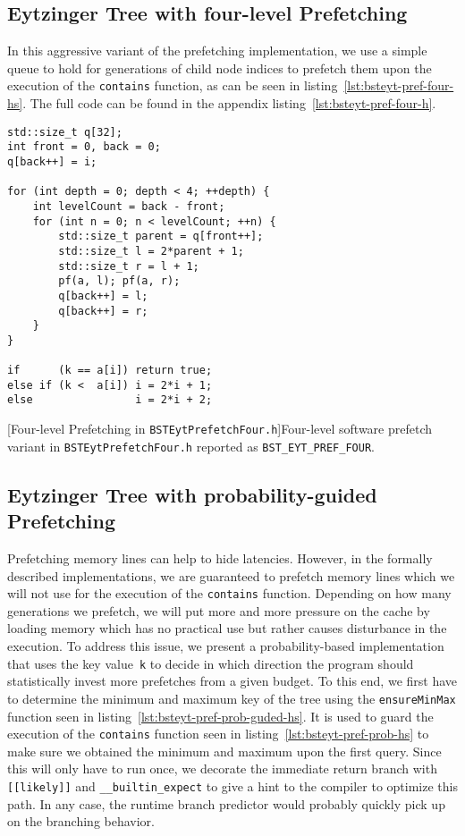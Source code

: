 \documentclass{article}
\begin{document}
\subsection{Eytzinger Tree with four-level Prefetching}
In this aggressive variant of the prefetching implementation, we use a simple queue to hold for generations of child node indices to prefetch them upon the execution of the \texttt{contains} function, as can be seen in listing~\ref{lst:bsteyt-pref-four-hs}. The full code can be found in the appendix listing~\ref{lst:bsteyt-pref-four-h}.
\begin{lstlisting}
std::size_t q[32];           
int front = 0, back = 0;
q[back++] = i;

for (int depth = 0; depth < 4; ++depth) {
    int levelCount = back - front;
    for (int n = 0; n < levelCount; ++n) {
        std::size_t parent = q[front++];
        std::size_t l = 2*parent + 1;
        std::size_t r = l + 1;
        pf(a, l); pf(a, r);
        q[back++] = l;
        q[back++] = r;
    }
}

if      (k == a[i]) return true;
else if (k <  a[i]) i = 2*i + 1;
else                i = 2*i + 2;
\end{lstlisting}
[Four-level Prefetching in \texttt{BSTEytPrefetchFour.h}]{Four-level software
prefetch variant in \texttt{BSTEytPrefetchFour.h} reported as \texttt{BST\_EYT\_PREF\_FOUR}.}
\label{lst:bsteyt-pref-four-hs}

\subsection{Eytzinger Tree with probability-guided Prefetching}
Prefetching memory lines can help to hide latencies. However, in the formally described implementations, we are guaranteed to prefetch memory lines which we will not use for the execution of the \texttt{contains} function. Depending on how many generations we prefetch, we will put more and more pressure on the cache by loading memory which has no practical use but rather causes disturbance in the execution. To address this issue, we present a probability-based implementation that uses the key value~\texttt{k} to decide in which direction the program should statistically invest more prefetches from a given budget. To this end, we first have to determine the minimum and maximum key of the tree using the \texttt{ensureMinMax} function seen in listing~\ref{lst:bsteyt-pref-prob-guded-hs}. It is used to guard the execution of the \texttt{contains} function seen in listing~\ref{lst:bsteyt-pref-prob-hs} to make sure we obtained the minimum and maximum upon the first query. Since this will only have to run once, we decorate the immediate return branch with \texttt{[[likely]]} and \texttt{\_\_builtin\_expect} to give a hint to the compiler to optimize this path. In any case, the runtime branch predictor would probably quickly pick up on the branching behavior. 
\end{document}
